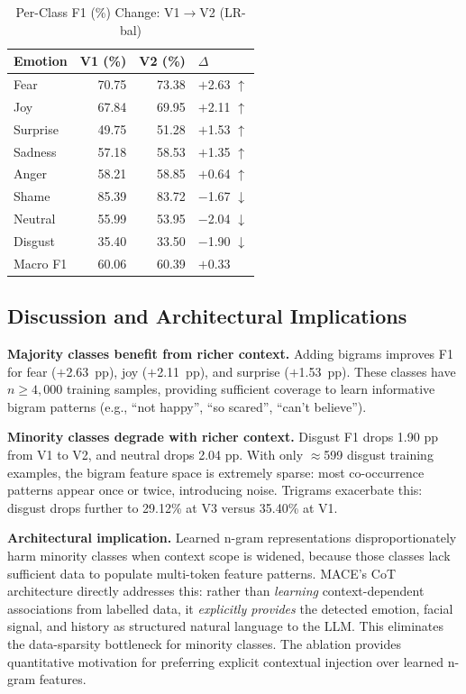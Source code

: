 \documentclass[sigconf, review=true]{acmart}
\begin{document}
\begin{table}[htbp]
\centering
\caption{Per-Class F1 (\%) Change: V1$\to$V2 (LR-bal)}
\label{tab:ablation_perclass}
\begin{tabular}{lrrl}
\toprule
\textbf{Emotion} & \textbf{V1 (\%)} & \textbf{V2 (\%)} &
\textbf{$\Delta$} \\
\midrule
Fear     & 70.75 & 73.38 & $+$2.63 $\uparrow$ \\
Joy      & 67.84 & 69.95 & $+$2.11 $\uparrow$ \\
Surprise & 49.75 & 51.28 & $+$1.53 $\uparrow$ \\
Sadness  & 57.18 & 58.53 & $+$1.35 $\uparrow$ \\
Anger    & 58.21 & 58.85 & $+$0.64 $\uparrow$ \\
Shame    & 85.39 & 83.72 & $-$1.67 $\downarrow$ \\
Neutral  & 55.99 & 53.95 & $-$2.04 $\downarrow$ \\
Disgust  & 35.40 & 33.50 & $-$1.90 $\downarrow$ \\
\midrule
Macro F1 & 60.06 & 60.39 & $+$0.33 \\
\bottomrule
\end{tabular}
\end{table}

\subsection{Discussion and Architectural Implications}

\textbf{Majority classes benefit from richer context.}
Adding bigrams improves F1 for fear ($+$2.63~pp), joy ($+$2.11~pp),
and surprise ($+$1.53~pp).
These classes have $n \geq 4{,}000$ training samples, providing
sufficient coverage to learn informative bigram patterns
(e.g., ``not happy'', ``so scared'', ``can't believe'').

\textbf{Minority classes degrade with richer context.}
Disgust F1 drops 1.90 pp from V1 to V2, and neutral drops
2.04 pp.
With only $\approx$599 disgust training examples, the bigram
feature space is extremely sparse: most co-occurrence patterns
appear once or twice, introducing noise.
Trigrams exacerbate this: disgust drops further to 29.12\%
at V3 versus 35.40\% at V1.

\textbf{Architectural implication.}
Learned n-gram representations disproportionately harm
minority classes when context scope is widened, because
those classes lack sufficient data to populate multi-token
feature patterns.
MACE's CoT architecture directly addresses this:
rather than \emph{learning} context-dependent associations
from labelled data, it \emph{explicitly provides} the
detected emotion, facial signal, and history as structured
natural language to the LLM.
This eliminates the data-sparsity bottleneck for minority
classes.
The ablation provides quantitative motivation for preferring
explicit contextual injection over learned n-gram features.
\end{document}
